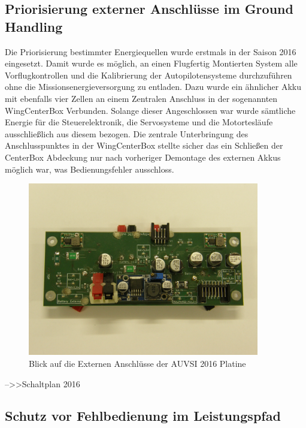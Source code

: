 \subsection{Priorisierung externer Anschlüsse im Ground Handling}

Die Priorisierung bestimmter Energiequellen wurde erstmals in der Saison 2016 eingesetzt.
Damit wurde es möglich, an einen Flugfertig Montierten System alle Vorflugkontrollen und die Kalibrierung der Autopilotensysteme durchzuführen ohne die Missionsenergieversorgung zu entladen. Dazu wurde ein ähnlicher Akku mit ebenfalls vier Zellen an einem Zentralen Anschluss in der sogenannten WingCenterBox Verbunden. Solange dieser Angeschlossen war wurde sämtliche Energie für die Steuerelektronik, die Servosysteme und die Motortesläufe ausschließlich aus diesem bezogen. Die zentrale Unterbringung des Anschlusspunktes in der WingCenterBox stellte sicher das ein Schließen der CenterBox Abdeckung nur nach vorheriger Demontage des externen Akkus möglich war, was Bedienungsfehler ausschloss.

\begin{figure}[H]
\centering
\includegraphics[width=0.9\textwidth]{bilder/Centerbox/Centerbox-Front_Power_AUVSI_2016_Oberseite.jpg} 
\caption{Blick auf die Externen Anschlüsse der AUVSI 2016 Platine} 
\label{fig:Blick auf die Externen Anschlüsse der AUVSI 2016 Platine}
\end{figure}

-->>Schaltplan 2016 


\subsection{Schutz vor Fehlbedienung im Leistungspfad}


